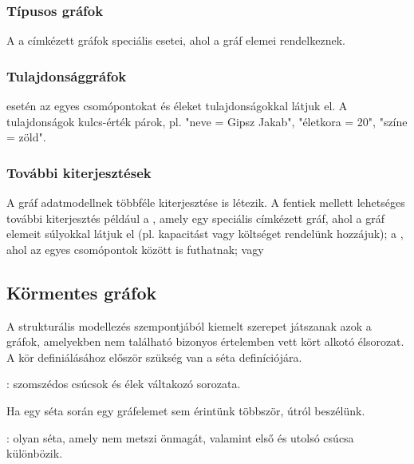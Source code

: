 \subsubsection{Típusos gráfok}

A  a címkézett gráfok speciális esetei, ahol a gráf elemei 
  rendelkeznek.
 
\subsubsection{Tulajdonsággráfok}

 esetén az egyes csomópontokat és éleket tulajdonságokkal látjuk el. A tulajdonságok kulcs-érték párok, pl. "neve = Gipsz Jakab", "életkora = 20", "színe = zöld".

\subsubsection{További kiterjesztések}

A gráf adatmodellnek többféle kiterjesztése is létezik. A fentiek mellett lehetséges további kiterjesztés például a , amely egy speciális címkézett gráf, ahol a gráf elemeit súlyokkal látjuk el (pl. kapacitást vagy költséget rendelünk hozzájuk); a , ahol az egyes csomópontok között  is futhatnak; vagy 



\subsection{Körmentes gráfok}

A strukturális modellezés szempontjából kiemelt szerepet játszanak azok a gráfok, amelyekben nem található bizonyos értelemben vett kört alkotó élsorozat. A kör definiálásához először szükség van a séta definíciójára.

\begin{definicio}
	: szomszédos csúcsok és élek váltakozó sorozata.
\end{definicio}

Ha egy séta során egy gráfelemet sem érintünk többször, útról beszélünk.

\begin{definicio}
: olyan séta, amely nem metszi önmagát, valamint első és utolsó csúcsa különbözik.
\end{definicio}

